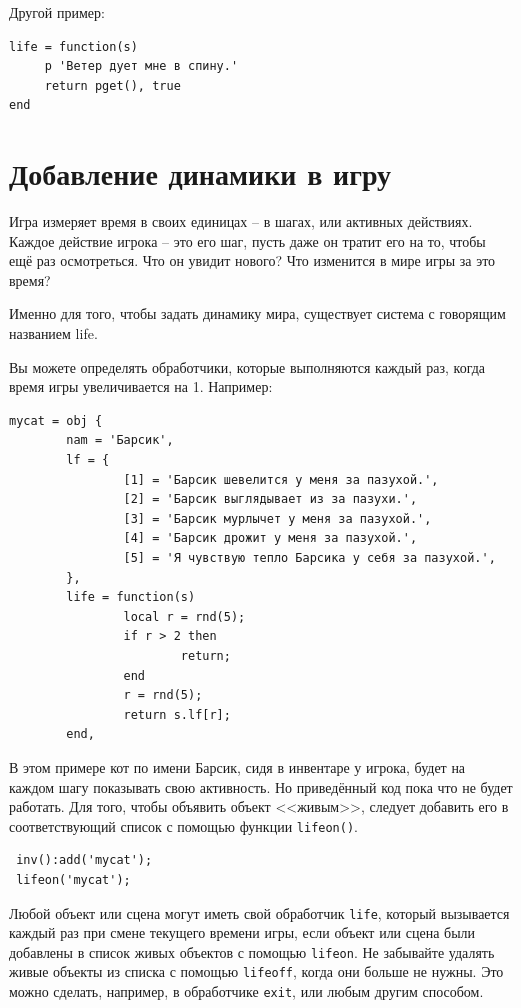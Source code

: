 \documentclass[12pt]{article}
\begin{document}
Другой пример:

\begin{verbatim}
life = function(s)
     p 'Ветер дует мне в спину.'
     return pget(), true
end
\end{verbatim}

\section{Добавление динамики в игру}

Игра измеряет время в своих единицах -- в шагах, или активных действиях. Каждое действие игрока -- это его шаг, пусть даже он тратит его на то, чтобы ещё раз осмотреться. Что он увидит нового? Что изменится в мире игры за это время?

Именно для того, чтобы задать динамику мира, существует система с говорящим названием life.

Вы можете определять обработчики, которые выполняются каждый раз, когда время игры увеличивается на 1. Например:

\begin{verbatim}
mycat = obj {
        nam = 'Барсик',
        lf = {
                [1] = 'Барсик шевелится у меня за пазухой.',
                [2] = 'Барсик выглядывает из за пазухи.',
                [3] = 'Барсик мурлычет у меня за пазухой.',
                [4] = 'Барсик дрожит у меня за пазухой.',
                [5] = 'Я чувствую тепло Барсика у себя за пазухой.',
        },
        life = function(s)
                local r = rnd(5);
                if r > 2 then
                        return;
                end
                r = rnd(5);
                return s.lf[r];
        end,
\end{verbatim}

В этом примере кот по имени Барсик, сидя в инвентаре у игрока, будет на каждом шагу показывать свою активность. Но приведённый код пока что не будет работать. Для того, чтобы объявить объект <<живым>>, следует добавить его в соответствующий список с помощью функции \verb/lifeon()/.

\begin{verbatim}
 inv():add('mycat');
 lifeon('mycat');
\end{verbatim}

Любой объект или сцена могут иметь свой обработчик \verb/life/, который вызывается каждый раз при смене текущего времени игры, если объект или сцена были добавлены в список живых объектов с помощью \verb/lifeon/. Не забывайте удалять живые объекты из списка с помощью \verb/lifeoff/, когда они больше не нужны. Это можно сделать, например, в обработчике \verb/exit/, или любым другим способом.
\end{document}

